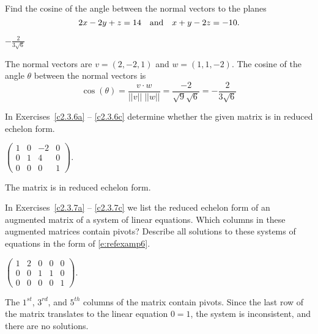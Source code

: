 \documentclass{ximera}
\begin{document}
\begin{exercise}\label{c2.2.85}

Find the cosine of the angle between the normal vectors to the planes 
\[
2x - 2y + z = 14 \quad\mbox{and}\quad x + y - 2z = -10.
\]

  
\begin{solution}

\ans $-\frac{2}{3\sqrt{6}}$

\soln The normal vectors are $v = (2, -2, 1)$ and $w = ( 1, 1 , -2)$.  The cosine of the angle $\theta$ between the normal vectors is 
\[
\cos(\theta) = \frac{v\cdot w}{||v||\; ||w||} = \frac{-2}{\sqrt{9}\sqrt{6}} = -\frac{2}{3\sqrt{6}}
\]

\end{solution}
\end{exercise}




\problemlabel

\noindent In Exercises~\ref{c2.3.6a} -- \ref{c2.3.6c} determine
whether the given matrix is in reduced echelon form.


\begin{exercise} \label{c2.3.6b}
$\left(\begin{array}{rrrr}
1 &  0 & -2 &   0   \\
0 &  1 &  4 &   0    \\
         0 &  0 &  0 &   1  \end{array}\right)$.

\begin{solution}
\ans The matrix is in reduced echelon form.

\end{solution}
\end{exercise}




\problemlabel

\noindent In Exercises~\ref{c2.3.7a} -- \ref{c2.3.7c} we list
the reduced echelon form of an augmented matrix of a system of
linear equations.  Which columns in these augmented matrices
contain pivots?  Describe all solutions to these systems of
equations in the form of \eqref{e:refexamp6}.


\begin{exercise} \label{c2.3.7b}
$\left(\begin{array}{rrrr|r}
 1  &  2 & 0 & 0 & 0\\
 0  &  0 & 1 & 1 & 0\\
 0  &  0 & 0 & 0 & 1
       \end{array}\right)$.

\begin{solution}
\ans The $1^{st}$, $3^{rd}$, and $5^{th}$ columns of the matrix
contain pivots.  Since the last row of the matrix translates to the linear
equation $0 = 1$, the system is inconsistent, and there are no solutions.

\end{solution}
\end{exercise}
\end{document}
